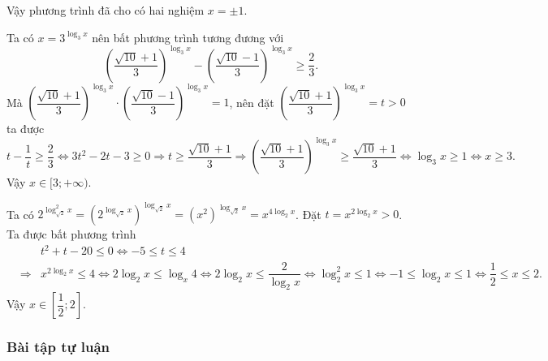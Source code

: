 \begin{vd}[1K6KK-A]
{\begin{listEX}
			Vậy phương trình đã cho có hai nghiệm $x=\pm 1$.
			\item Ta có $x=3^{\log_3x}$ nên bất phương trình tương đương với
			$$\left(\dfrac{\sqrt{10}+1}{3}\right)^{\log_3x}-\left(\dfrac{\sqrt{10}-1}{3}\right)^{\log_3x}\ge \dfrac{2}{3}.$$
			Mà $\left(\dfrac{\sqrt{10}+1}{3}\right)^{\log_3x}\cdot \left(\dfrac{\sqrt{10}-1}{3}\right)^{\log_3x}=1$, nên đặt $\left(\dfrac{\sqrt{10}+1}{3}\right)^{\log_3x}=t>0$ ta được
			$$t-\dfrac{1}{t}\ge \dfrac{2}{3}\Leftrightarrow 3t^2-2t-3\ge 0\Rightarrow t\ge \dfrac{\sqrt{10}+1}{3}\Rightarrow \left(\dfrac{\sqrt{10}+1}{3}\right)^{\log_3x}\ge \dfrac{\sqrt{10}+1}{3}\Leftrightarrow \log_3x\ge 1\Leftrightarrow x\ge 3.$$
			Vậy $x \in[3;+\infty)$.
			\item Ta có $2^{\log_{\sqrt{2}}^2 x}=\left(2^{\log_{\sqrt{2}} x}\right)^{\log_{\sqrt{2}} x}=\left(x^2\right)^{\log_{\sqrt{2}} x}=x^{4\log_2 x}$. Đặt $t=x^{2\log_2 x}>0$. Ta được bất phương trình
			\begin{eqnarray*}
				&& t^2+t-20\le 0\Leftrightarrow -5\le t\le 4\\
				& \Rightarrow &  x^{2\log_2 x}\le 4 \Leftrightarrow 2\log_2x\le \log_x 4
				\Leftrightarrow 2\log_2x\le \dfrac{2}{\log_2 x}\Leftrightarrow \log_2^2 x\le 1
				\Leftrightarrow -1\le \log_2 x\le 1\Leftrightarrow \dfrac{1}{2}\le x\le 2.
			\end{eqnarray*}
			Vậy $x\in\left[\dfrac{1}{2};2\right]$.
		\end{listEX}	
	}
\end{vd}

\subsubsection{Bài tập tự luận}

